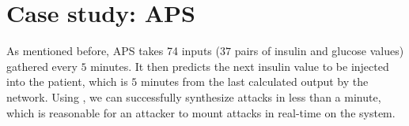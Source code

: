 \section{Case study: APS}

As mentioned before, \ac{APS} takes 74 inputs ($37$ pairs of insulin and glucose values) gathered every $5$ minutes. 
It then predicts the next insulin value to be injected into the patient, which is $5$ minutes from the last calculated output by the network. 
%
Using \tool, we can successfully synthesize attacks in less than a minute, which is reasonable for an attacker to mount attacks in real-time on the system.







